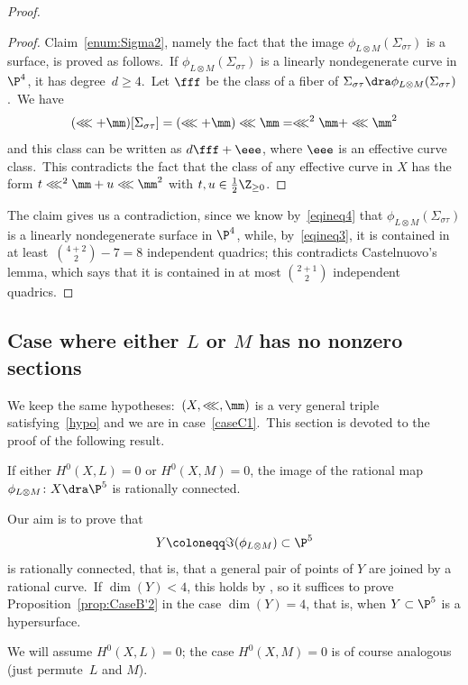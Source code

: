 \begin{proof}
\begin{proof}
Claim~\ref{enum:Sigma2}, namely the fact that the image $\phi_{L\otimes M}(\Sigma_{\sigma\tau})$ is a surface, is proved as follows.\
If $\phi_{L\otimes M}(\Sigma_{\sigma\tau})$ is a linearly nondegenerate curve in $\P^4$, it has degree~$d\ge4$.\ Let $\fff$ be the class of a fiber of $\Sigma_{\sigma\tau}\dra\phi_{L\otimes M}(\Sigma_{\sigma\tau})$.\
 We have
\[
(\lll+\mm)[\Sigma_{\sigma\tau}]=(\lll+\mm)\lll\mm = \lll^2\mm + \lll\mm^2
\]
and this class can be written as $d\fff+\eee$, where $\eee$ is an effective curve class.\  This contradicts the fact that the class of any effective curve in $X$ has the form $t \lll^2\mm+u \lll\mm^2$  with   $t, u\in\frac12\Z_{\ge0}$.\end{proof}
The claim gives us a contradiction, since we know by~\eqref{eqineq4} that $\phi_{L\otimes M}(\Sigma_{\sigma\tau})$ is a linearly nondegenerate surface in $\P^4$, while, by~\eqref{eqineq3}, it is contained in at least~$\binom{4+2}{2}-7=8$
independent quadrics; this contradicts Castelnuovo's lemma, which says that it is contained in at most $\binom{2+1}{2}$ independent quadrics.
\end{proof}


\subsection{Case where either $L$ or $M$   has no nonzero sections}\label{zero}
We keep the same hypotheses:~$(X,\lll,\mm)$ is a very   general triple satisfying~\eqref{hypo} and we are in case~\ref{caseC1}.\ This section is devoted to the proof of the following result.

\begin{prop}
\notready\label{prop:CaseB'2}
If  either $H^0(X,L)=0$ or $H^0(X,M)=0$, the image of the rational map $\phi_{L\otimes M}\colon X\dra \P^5$ is rationally connected.
\end{prop}

Our aim is to prove that
 \[
Y\coloneqq\Im(\phi_{L\otimes M})\subset \P^5
\]
is rationally connected, that is, that a general pair of points of $Y$ are joined by a rational curve.\
If \mbox{$\dim (Y)<4$,} this holds  by \cite[Theorem~1.4]{linthese}, so it suffices to prove Proposition~\ref{prop:CaseB'2} in  the case $\dim (Y)=4$, that is, when $Y\subset \P^5$ is a hypersurface.\

 We will assume  $H^0(X,L)=0$; the case  $H^0(X,M)=0$ is of course analogous (just permute~$L$ and $M$).\

